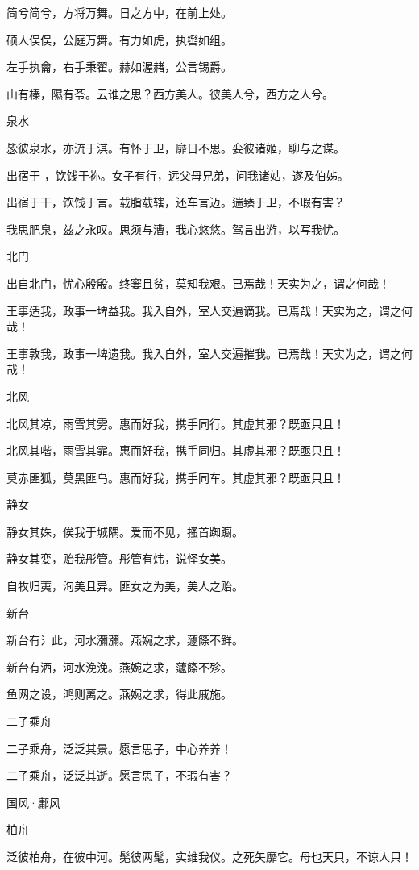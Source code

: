 简兮简兮，方将万舞。日之方中，在前上处。

硕人俣俣，公庭万舞。有力如虎，执辔如组。

左手执龠，右手秉翟。赫如渥赭，公言锡爵。

山有榛，隰有苓。云谁之思？西方美人。彼美人兮，西方之人兮。

泉水

毖彼泉水，亦流于淇。有怀于卫，靡日不思。娈彼诸姬，聊与之谋。

出宿于 ，饮饯于祢。女子有行，远父母兄弟，问我诸姑，遂及伯姊。

出宿于干，饮饯于言。载脂载辖，还车言迈。遄臻于卫，不瑕有害？

我思肥泉，兹之永叹。思须与漕，我心悠悠。驾言出游，以写我忧。

北门

出自北门，忧心殷殷。终窭且贫，莫知我艰。已焉哉！天实为之，谓之何哉！

王事适我，政事一埤益我。我入自外，室人交遍谪我。已焉哉！天实为之，谓之何哉！

王事敦我，政事一埤遗我。我入自外，室人交遍摧我。已焉哉！天实为之，谓之何哉！

北风

北风其凉，雨雪其雱。惠而好我，携手同行。其虚其邪？既亟只且！

北风其喈，雨雪其霏。惠而好我，携手同归。其虚其邪？既亟只且！

莫赤匪狐，莫黑匪乌。惠而好我，携手同车。其虚其邪？既亟只且！

静女

静女其姝，俟我于城隅。爱而不见，搔首踟蹰。

静女其娈，贻我彤管。彤管有炜，说怿女美。

自牧归荑，洵美且异。匪女之为美，美人之贻。

新台

新台有氵此，河水瀰瀰。燕婉之求，蘧篨不鲜。

新台有洒，河水浼浼。燕婉之求，蘧篨不殄。

鱼网之设，鸿则离之。燕婉之求，得此戚施。

二子乘舟

二子乘舟，泛泛其景。愿言思子，中心养养！

二子乘舟，泛泛其逝。愿言思子，不瑕有害？




国风·鄘风


柏舟

泛彼柏舟，在彼中河。髧彼两髦，实维我仪。之死矢靡它。母也天只，不谅人只！


